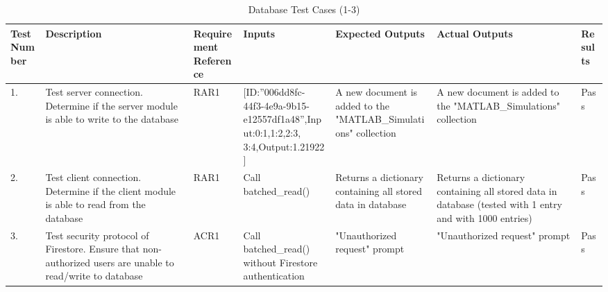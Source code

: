 \documentclass[12pt, titlepage]{article}
\begin{document}
\begin{center}
    \begin{table}[H]
        \centering
        \begin{tabular}{|p{1cm}|p{2.2cm}|p{2.5cm}|p{2.7cm}|p{2.4cm}|p{2.4cm}|p{1.3cm}|}
        \hline
        \bf Test Number & \bf Description & \bf Requirement Reference & \bf Inputs & \bf Expected Outputs & \bf Actual Outputs & \bf Results \\
        \hline
        1. & Test server connection. Determine if the server module is able to write to the database & RAR1 & [ID:”006dd8fc-44f3-4e9a-9b15-e12557df1a48”,\newline Input:{0:1,1:2,2:3,\newline3:4},\newline Output:1.21922\newline2] & A new document is added to the "MATLAB\_Simula\newline tions" collection & A new document is added to the "MATLAB\_Simula\newline tions" collection & Pass\\
        \hline
        2. & Test client connection. Determine if the client module is able to read from the database & RAR1 & Call batched\_read() & Returns a dictionary containing all stored data in database & Returns a dictionary containing all stored data in database (tested with 1 entry and with 1000 entries) & Pass\\
        \hline
        3. & Test security protocol of Firestore. Ensure that non-authorized users are unable to read/write to database & ACR1 & Call batched\_read() without Firestore authentication & "Unauthorized request" prompt & "Unauthorized request" prompt & Pass\\
        \hline
        \end{tabular}
        \caption{Database Test Cases (1-3)}
        \label{tab:my_label12}
    \end{table}
\end{center}
\end{document}

